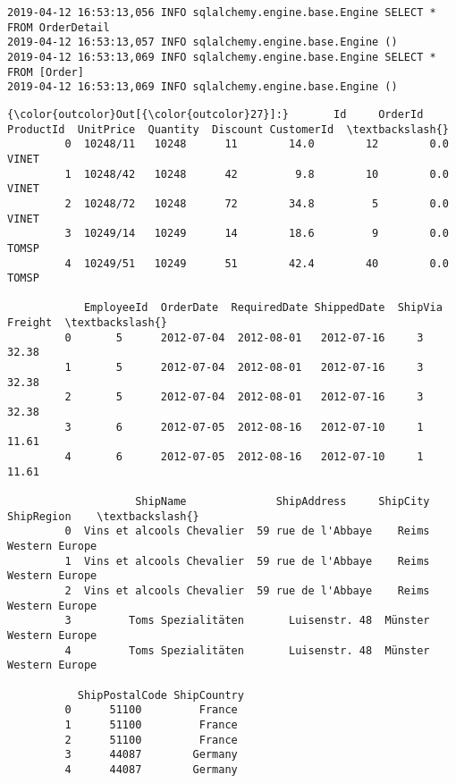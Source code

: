 \documentclass[11pt]{article}
\begin{document}
    \begin{Verbatim}[commandchars=\\\{\}]
2019-04-12 16:53:13,056 INFO sqlalchemy.engine.base.Engine SELECT * FROM OrderDetail
2019-04-12 16:53:13,057 INFO sqlalchemy.engine.base.Engine ()
2019-04-12 16:53:13,069 INFO sqlalchemy.engine.base.Engine SELECT * FROM [Order]
2019-04-12 16:53:13,069 INFO sqlalchemy.engine.base.Engine ()

    \end{Verbatim}

\begin{Verbatim}[commandchars=\\\{\}]
{\color{outcolor}Out[{\color{outcolor}27}]:}       Id     OrderId  ProductId  UnitPrice  Quantity  Discount CustomerId  \textbackslash{}
         0  10248/11   10248      11        14.0        12        0.0      VINET     
         1  10248/42   10248      42         9.8        10        0.0      VINET     
         2  10248/72   10248      72        34.8         5        0.0      VINET     
         3  10249/14   10249      14        18.6         9        0.0      TOMSP     
         4  10249/51   10249      51        42.4        40        0.0      TOMSP     
         
            EmployeeId  OrderDate  RequiredDate ShippedDate  ShipVia  Freight  \textbackslash{}
         0       5      2012-07-04  2012-08-01   2012-07-16     3      32.38    
         1       5      2012-07-04  2012-08-01   2012-07-16     3      32.38    
         2       5      2012-07-04  2012-08-01   2012-07-16     3      32.38    
         3       6      2012-07-05  2012-08-16   2012-07-10     1      11.61    
         4       6      2012-07-05  2012-08-16   2012-07-10     1      11.61    
         
                    ShipName              ShipAddress     ShipCity    ShipRegion    \textbackslash{}
         0  Vins et alcools Chevalier  59 rue de l'Abbaye    Reims  Western Europe   
         1  Vins et alcools Chevalier  59 rue de l'Abbaye    Reims  Western Europe   
         2  Vins et alcools Chevalier  59 rue de l'Abbaye    Reims  Western Europe   
         3         Toms Spezialitäten       Luisenstr. 48  Münster  Western Europe   
         4         Toms Spezialitäten       Luisenstr. 48  Münster  Western Europe   
         
           ShipPostalCode ShipCountry  
         0      51100         France   
         1      51100         France   
         2      51100         France   
         3      44087        Germany   
         4      44087        Germany   
\end{Verbatim}
            
\end{document}
